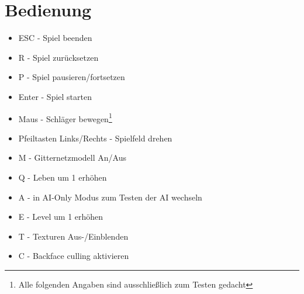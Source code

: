 \section{Bedienung}
\begin{itemize}
	\item ESC - Spiel beenden
	\item R - Spiel zurücksetzen
	\item P - Spiel pausieren/fortsetzen
	\item Enter - Spiel starten
	\item Maus - Schläger bewegen\footnote{Alle folgenden Angaben sind ausschließlich zum Testen gedacht}
	\item Pfeiltasten Links/Rechts - Spielfeld drehen
	\item M - Gitternetzmodell An/Aus
	\item Q - Leben um 1 erhöhen
	\item A - in AI-Only Modus zum Testen der AI wechseln
	\item E - Level um 1 erhöhen
	\item T - Texturen Aus-/Einblenden
	\item C - Backface culling aktivieren
\end{itemize}